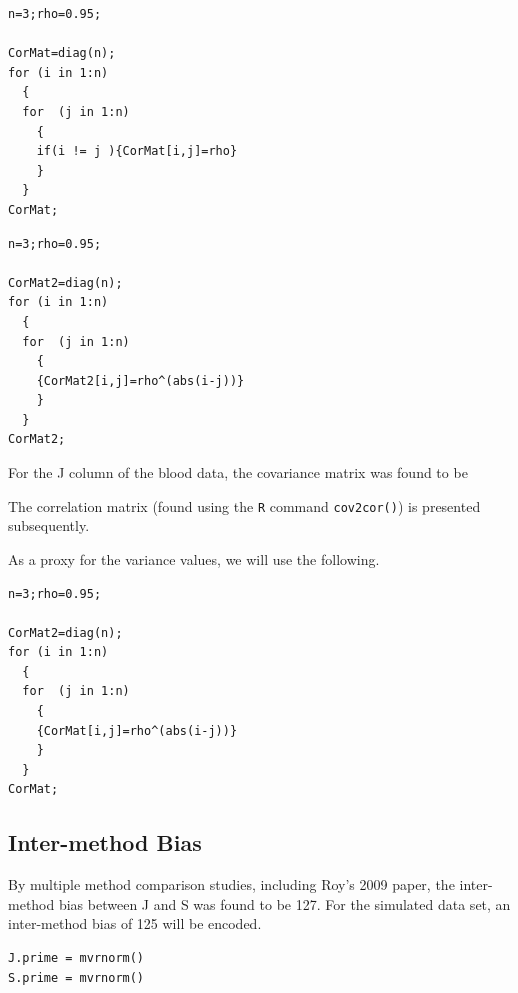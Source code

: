 

\begin{framed}
\begin{verbatim}
n=3;rho=0.95;

CorMat=diag(n);
for (i in 1:n)
  {
  for  (j in 1:n)
    {
    if(i != j ){CorMat[i,j]=rho}
    }
  }
CorMat;
\end{verbatim}
\end{framed}



\begin{framed}
\begin{verbatim}
n=3;rho=0.95;

CorMat2=diag(n);
for (i in 1:n)
  {
  for  (j in 1:n)
    {
    {CorMat2[i,j]=rho^(abs(i-j))}
    }
  }
CorMat2;
\end{verbatim}
\end{framed}


For the J column of the blood data, the covariance matrix was found to be

The correlation matrix (found using the \texttt{R} command \texttt{cov2cor()}) is presented subsequently.


As a proxy for the variance values, we will use the following.

\begin{framed}
\begin{verbatim}
n=3;rho=0.95;

CorMat2=diag(n);
for (i in 1:n)
  {
  for  (j in 1:n)
    {
    {CorMat[i,j]=rho^(abs(i-j))}
    }
  }
CorMat;
\end{verbatim}
\end{framed}


\subsection{Inter-method Bias}

By multiple method comparison studies, including Roy's 2009 paper, the inter-method bias between J and S was found to be 127.
For the simulated data set, an inter-method bias of 125 will be encoded.


\begin{framed}
\begin{verbatim}
J.prime = mvrnorm()
S.prime = mvrnorm()
\end{verbatim}
\end{framed}

